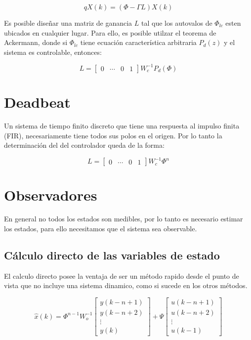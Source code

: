 \begin{equation}
    qX(k) = (\Phi - \Gamma L)X(k)
\end{equation}

Es posible diseñar una matriz de ganancia $L$ tal que los autovalos de $\Phi_{lc}$
esten ubicados en cualquier lugar. Para ello, es posible utilzar el teorema de Ackermann, 
donde si $\Phi_{lc}$ tiene ecuación característica arbitraria $P_d(z)$ y 
el sistema es controlable, entonces: 

\begin{equation}
    L = \begin{bmatrix}
        0 & \cdots & 0 & 1
    \end{bmatrix}
    W^{-1}_c P_d(\Phi)
\end{equation}

\section{Deadbeat}

Un sistema de tiempo finito discreto que tiene una respuesta al impulso finita (FIR), 
necesariamente tiene todos sus polos en el origen. Por lo tanto la determinación del 
del controlador queda de la forma: 

\begin{equation}
    L = \begin{bmatrix}
        0 & \cdots & 0 & 1
    \end{bmatrix}
    W^{-1}_c \Phi^n
\end{equation}

\section{Observadores}

En general no todos los estados son medibles, por lo tanto es necesario 
estimar los estados, para ello necesitamos que el sistema sea observable.

\subsection{Cálculo directo de las variables de estado}

El calculo directo posee la ventaja de ser un método rapido desde el punto de vista 
que no incluye una sistema dinamico, como si sucede en los otros métodos. 

\begin{equation}
    \hat{x}(k) = \Phi^{n-1} W^{-1}_o 
    \begin{bmatrix}
        y(k-n+1) \\ 
        y(k-n+2) \\ 
        \vdots \\ 
        y(k)
    \end{bmatrix} + 
    \Psi 
    \begin{bmatrix}
        u(k-n+1) \\ 
        u(k-n+2) \\ 
        \vdots \\ 
        u(k-1)
    \end{bmatrix}
\end{equation}

